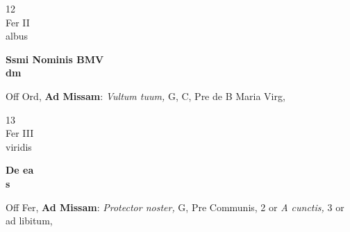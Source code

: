 \documentclass[10pt, openany]{book}
\begin{document}
        \begin{center}
            \begin{minipage}{3.5in}
                \vspace{2em}
                \begin{minipage}{0.5in}
                    {\Huge 12} \\
                    {\normalsize Fer II} \\
                    {\normalsize albus}
                \end{minipage}
                \begin{minipage}{3.0in}
                    \textbf{ \large Ssmi Nominis BMV \\
                    \textnormal{\normalsize dm}} \\ 
                \end{minipage}
                \begin{justify}Off Ord, \textbf{Ad Missam}: \textit{Vultum tuum,} G, C, Pre de B Maria Virg,   
                \end{justify}
            \end{minipage}
        \end{center}
    
        \begin{center}
            \begin{minipage}{3.5in}
                \vspace{2em}
                \begin{minipage}{0.5in}
                    {\Huge 13} \\
                    {\normalsize Fer III} \\
                    {\normalsize viridis}
                \end{minipage}
                \begin{minipage}{3.0in}
                    \textbf{ \large De ea \\
                    \textnormal{\normalsize s}} \\ 
                \end{minipage}
                \begin{justify}Off Fer, \textbf{Ad Missam}: \textit{Protector noster,} G, Pre Communis, 2 or \textit{A cunctis,} 3 or ad libitum,   
                \end{justify}
            \end{minipage}
        \end{center}
    
\end{document}

